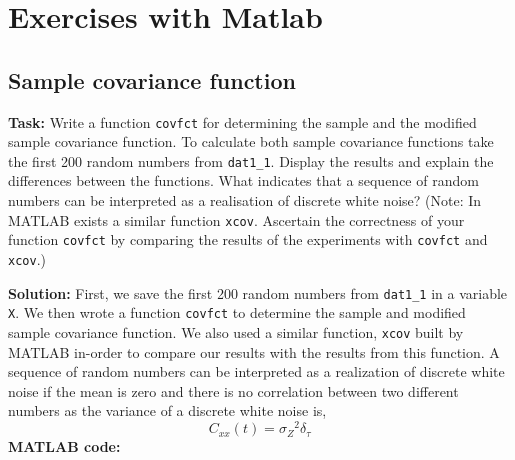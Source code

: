 
\chapter{Exercises with Matlab}


\section{ Sample covariance function } \label{ Sample covariance function } 
\noindent \textbf{Task:} Write a function \texttt{covfct} for determining the sample and the modified sample covariance function. To calculate both sample covariance functions take the first 200 random numbers from \texttt{dat1\_1}. Display the results and explain the differences between the functions. What indicates that a sequence of random numbers can be interpreted as a realisation of discrete white noise?
(Note: In MATLAB exists a similar function \texttt{xcov}. Ascertain the correctness of your function \texttt{covfct} by comparing the results of the experiments with \texttt{covfct} and \texttt{xcov}.)

\noindent \textbf{Solution:}
\noindent First, we save the first 200 random numbers from \texttt{dat1\_1} in a variable \texttt{X}. We then wrote a function \texttt{covfct} to determine the sample and modified sample covariance function. We also used a similar function, \texttt{xcov} built by MATLAB in-order to compare our results with the results from this function. A sequence of random numbers can be interpreted as a realization of discrete white noise if the mean is zero and there is no correlation between two different numbers as the variance of a discrete white noise is,
$$ C_{xx}(t) = {\sigma_Z}^2 \delta_\tau    $$
\noindent \textbf{MATLAB code:}


